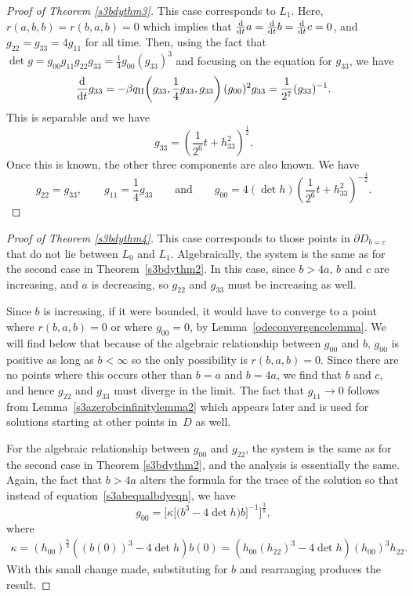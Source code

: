 \documentclass[10pt,a4paper]{amsart}
\numberwithin{equation}{section}
\newcommand{\dtime}{\frac{{\rm d}}{{\rm d} t}} %
\begin{document}
\begin{proof}[Proof of Theorem \ref{s3bdythm3}]
This case corresponds to $L_1$. Here, $r(a, b, b) = r(b, a, b) = 0$ which implies that $\dtime a = \dtime b = \dtime c = 0$, and $g_{22} = g_{33} = 4g_{11}$ for all time. Then, using the fact that $\det g = g_{00} g_{11} g_{22} g_{33} = \frac{1}{4} g_{00} (g_{33})^3$ and focusing on the equation for $g_{33}$, we have
\begin{equation*}
\dtime g_{33} = -\beta q_{\rm II}\! \left(g_{33}, \frac{1}{4} g_{33}, g_{33} \right) (g_{00})^2 g_{33}
		= \frac{1}{2^7} (g_{33})^{-1}.
\end{equation*}
This is separable and we have
\[
g_{33} = \left(\frac{1}{2^6} t + h_{33}^2 \right)^{\frac{1}{2}}.
\]
Once this is known, the other three components are also known. We have
\begin{equation*}
g_{22} = g_{33},\qquad g_{11} = \frac{1}{4} g_{33}
\qquad \text{and}\qquad
g_{00} = 4 (\det h) \left(\frac{1}{2^6} t + h_{33}^2\right)^{-\frac{3}{2}}.\tag*{\qed}
\end{equation*}
 \renewcommand{\qed}{}
\end{proof}

\begin{proof}[Proof of Theorem \ref{s3bdythm4}]
This case corresponds to those points in $\partial D_{b = c}$ that do not lie between $L_0$ and $L_1$. Algebraically, the system is the same as for the second case in Theorem~\ref{s3bdythm2}. In this case, since $b > 4a$, $b$ and $c$ are increasing, and $a$ is decreasing, so $g_{22}$ and $g_{33}$ must be increasing as well.

Since $b$ is increasing, if it were bounded, it would have to converge to a point where \mbox{$r(b, a, b)\! =\! 0$} or where $g_{00} = 0$, by Lemma~\ref{odeconvergencelemma}. We will find below that because of the algebraic relationship between $g_{00}$ and $b$, $g_{00}$ is positive as long as $b < \infty$ so the only possibility is $r(b, a, b) = 0$. Since there are no points where this occurs other than $b = a$ and $b = 4a$, we find that $b$ and $c$, and hence $g_{22}$ and $g_{33}$ must diverge in the limit. The fact that $g_{11} \rightarrow 0$ follows from Lemma~\ref{s3azerobcinfinitylemma2} which appears later and is used for solutions starting at other points in~$D$ as well.

For the algebraic relationship between $g_{00}$ and $g_{22}$, the system is the same as for the second case in Theorem \ref{s3bdythm2}, and the analysis is essentially the same. Again, the fact that $b > 4a$ alters the formula for the trace of the solution so that instead of equation~\eqref{s3abequalbdyeqn}, we have
\begin{equation*} \label{s3bcequalbdyeqn}
g_{00} = \bigl[\kappa \bigl[\big(b^3 - 4 \det h\big) b \bigr]^{-1} \bigr]^{\frac{3}{8}},
\end{equation*}
where
\begin{gather*}
\kappa = (h_{00})^{\frac{8}{3}} ((b(0))^3 - 4 \det h) b(0)
	= (h_{00} (h_{22})^3 - 4 \det h) (h_{00})^3 h_{22}.
\end{gather*}
With this small change made, substituting for $b$ and rearranging produces the result.
\end{proof}
\end{document}

